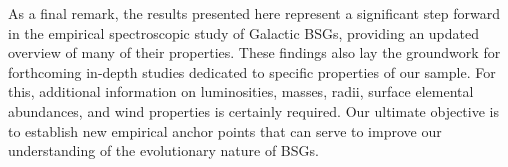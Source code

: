\documentclass{aa}
\begin{document}
As a final remark, the results presented here represent a significant step forward in the empirical spectroscopic study of Galactic BSGs, providing an updated overview of many of their properties. These findings also lay the groundwork for forthcoming in-depth studies dedicated to specific properties of our sample. For this, additional information on luminosities, masses, radii, surface elemental abundances, and wind properties is certainly required. Our ultimate objective is to establish new empirical anchor points that can serve to improve our understanding of the evolutionary nature of BSGs.



\end{document}
